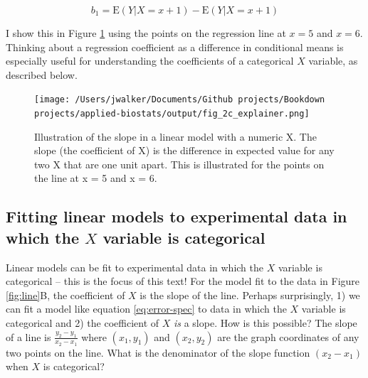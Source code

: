 \documentclass[]{book}
\begin{document}
\begin{equation}
b_1 = \mathrm{E}(Y|X=x+1) - \mathrm{E}(Y|X=x+1)
\end{equation}

I show this in Figure \ref{fig:intro-linear-models-cont-slope} using the points on the regression line at \(x = 5\) and \(x = 6\). Thinking about a regression coefficient as a difference in conditional means is especially useful for understanding the coefficients of a categorical \(X\) variable, as described below.

\begin{figure}
\centering
\texttt{[image: /Users/jwalker/Documents/Github projects/Bookdown projects/applied-biostats/output/fig\_2c\_explainer.png]}
\caption{\label{fig:intro-linear-models-cont-slope}Illustration of the slope in a linear model with a numeric X. The slope (the coefficient of X) is the difference in expected value for any two X that are one unit apart. This is illustrated for the points on the line at x = 5 and x = 6.}
\end{figure}

\hypertarget{fitting-linear-models-to-experimental-data-in-which-the-x-variable-is-categorical}{%
\subsection{\texorpdfstring{Fitting linear models to experimental data in which the \(X\) variable is categorical}{Fitting linear models to experimental data in which the X variable is categorical}}\label{fitting-linear-models-to-experimental-data-in-which-the-x-variable-is-categorical}}

Linear models can be fit to experimental data in which the \(X\) variable is categorical -- this is the focus of this text! For the model fit to the data in Figure \ref{fig:line}B, the coefficient of \(X\) is the slope of the line. Perhaps surprisingly, 1) we can fit a model like equation \eqref{eq:error-spec} to data in which the \(X\) variable is categorical and 2) the coefficient of \(X\) \emph{is} a slope. How is this possible? The slope of a line is \(\frac{y_2 - y_1}{x_2 - x_1}\) where \((x_1, y_1)\) and \((x_2, y_2)\) are the graph coordinates of any two points on the line. What is the denominator of the slope function \((x_2 - x_1)\) when \(X\) is categorical?
\end{document}
